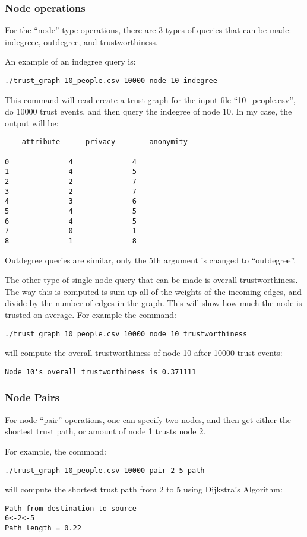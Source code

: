 \documentclass{article}
\begin{document}
\subsubsection{Node operations}
For the ``node'' type operations, there are 3 types of queries that can be made: 
indegreee, outdegree, and trustworthiness. 

An example of an indegree query is: 
\begin{verbatim}
./trust_graph 10_people.csv 10000 node 10 indegree
\end{verbatim}
This command will read create a trust graph for the input file ``10\_people.csv'', 
do 10000 trust events, and then query the indegree of node 10. In my case, the output
will be: 
\begin{verbatim}
    attribute      privacy        anonymity      
---------------------------------------------
0              4              4              
1              4              5              
2              2              7              
3              2              7              
4              3              6              
5              4              5              
6              4              5              
7              0              1              
8              1              8        
\end{verbatim}

Outdegree queries are similar, only the 5th argument is changed to ``outdegree''. 

The other type of single node query that can be made is overall trustworthiness. The
way this is computed is sum up all of the weights of the incoming edges, and divide
by the number of edges in the graph. This will show how much the node is trusted 
on average. For example the command: 
\begin{verbatim}
./trust_graph 10_people.csv 10000 node 10 trustworthiness
\end{verbatim}
will compute the overall trustworthiness of node 10 after 10000 trust events: 
\begin{verbatim}
Node 10's overall trustworthiness is 0.371111
\end{verbatim}
\subsubsection{Node Pairs}
For node ``pair'' operations, one can specify two nodes, and then get either
the shortest trust path, or amount of node 1 trusts node 2. 

For example, the command: 
\begin{verbatim}
./trust_graph 10_people.csv 10000 pair 2 5 path
\end{verbatim}
will compute the shortest trust path from 2 to 5 using Dijkstra's Algorithm: 
\begin{verbatim}
Path from destination to source
6<-2<-5
Path length = 0.22
\end{verbatim}
\end{document}
